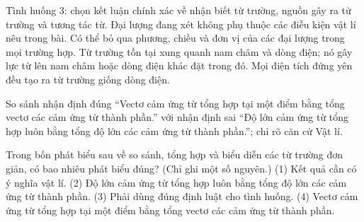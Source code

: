 \begin{ex}
Tình huống 3: chọn kết luận chính xác về nhận biết từ trường, nguồn gây ra từ trường và tương tác từ.
\choice
{Đại lượng đang xét không phụ thuộc các điều kiện vật lí nêu trong bài.}
{Có thể bỏ qua phương, chiều và đơn vị của các đại lượng trong mọi trường hợp.}
{\True Từ trường tồn tại xung quanh nam châm và dòng điện; nó gây lực từ lên nam châm hoặc dòng điện khác đặt trong đó.}
{Mọi điện tích đứng yên đều tạo ra từ trường giống dòng điện.}
\end{ex}

\begin{bt}
So sánh nhận định đúng “Vectơ cảm ứng từ tổng hợp tại một điểm bằng tổng vectơ các cảm ứng từ thành phần.” với nhận định sai “Độ lớn cảm ứng từ tổng hợp luôn bằng tổng độ lớn các cảm ứng từ thành phần.”; chỉ rõ căn cứ Vật lí.
\end{bt}

\begin{ex}
Trong bốn phát biểu sau về so sánh, tổng hợp và biểu diễn các từ trường đơn giản, có bao nhiêu phát biểu đúng? (Chỉ ghi một số nguyên.) (1) Kết quả cần có ý nghĩa vật lí. (2) Độ lớn cảm ứng từ tổng hợp luôn bằng tổng độ lớn các cảm ứng từ thành phần. (3) Phải dùng đúng định luật cho tình huống. (4) Vectơ cảm ứng từ tổng hợp tại một điểm bằng tổng vectơ các cảm ứng từ thành phần.
\end{ex}

